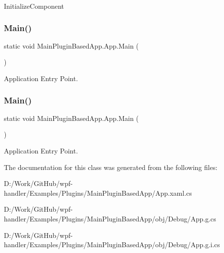 Initialize\+Component 

\mbox{\label{class_main_plugin_based_app_1_1_app_ac30ebe1741c7bd7c33a7ffff519403f1}} 
\subsubsection{\texorpdfstring{Main()}{Main()}\hspace{0.1cm}{\footnotesize\ttfamily [1/2]}}
{\footnotesize\ttfamily static void Main\+Plugin\+Based\+App.\+App.\+Main (\begin{DoxyParamCaption}{ }\end{DoxyParamCaption})\hspace{0.3cm}{\ttfamily [static]}}



Application Entry Point. 

\mbox{\label{class_main_plugin_based_app_1_1_app_ac30ebe1741c7bd7c33a7ffff519403f1}} 
\subsubsection{\texorpdfstring{Main()}{Main()}\hspace{0.1cm}{\footnotesize\ttfamily [2/2]}}
{\footnotesize\ttfamily static void Main\+Plugin\+Based\+App.\+App.\+Main (\begin{DoxyParamCaption}{ }\end{DoxyParamCaption})\hspace{0.3cm}{\ttfamily [static]}}



Application Entry Point. 



The documentation for this class was generated from the following files\+:\begin{DoxyCompactItemize}
\item 
D\+:/\+Work/\+Git\+Hub/wpf-\/handler/\+Examples/\+Plugins/\+Main\+Plugin\+Based\+App/App.\+xaml.\+cs\item 
D\+:/\+Work/\+Git\+Hub/wpf-\/handler/\+Examples/\+Plugins/\+Main\+Plugin\+Based\+App/obj/\+Debug/App.\+g.\+cs\item 
D\+:/\+Work/\+Git\+Hub/wpf-\/handler/\+Examples/\+Plugins/\+Main\+Plugin\+Based\+App/obj/\+Debug/App.\+g.\+i.\+cs\end{DoxyCompactItemize}
